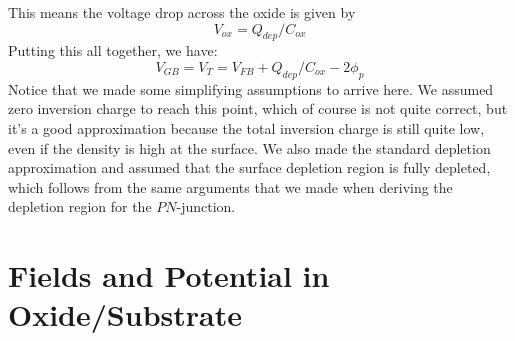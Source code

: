 This means the voltage drop across the oxide is given by
    \begin{equation}
        V_{ox} = Q_{dep} / C_{ox} 
    \end{equation}
Putting this all together, we have:
    \begin{equation}
        V_{GB} = V_T = V_{FB} + Q_{dep}/C_{ox} - 2 \phi_p
    \end{equation}
Notice that we made some simplifying assumptions to arrive here.  We assumed zero inversion charge to reach this point, which of course is not quite correct, but it's a good approximation because the total inversion charge is still quite low, even if the density is high at the surface.  We also made the standard depletion approximation and assumed that the surface depletion region is fully depleted, which follows from the same arguments that we made when deriving the depletion region for the $PN$-junction.
\section{Fields and Potential in Oxide/Substrate}
